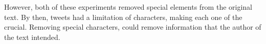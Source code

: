 
However, both of these experiments removed special elements from the original text. By then, tweets had a limitation of characters, making each one of the crucial. Removing special
characters, could remove information that the author of the text intended. 


%
%
%
%
%
%

